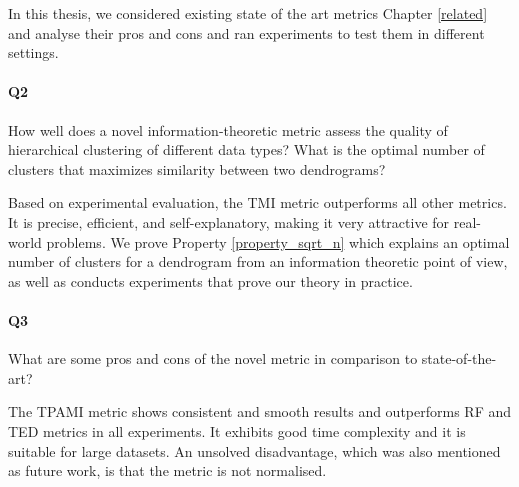 In this thesis, we considered existing state of the art metrics Chapter \ref{related} and analyse their pros and cons and ran experiments to test them in different settings. 

\paragraph{Q2}
How well does a novel information-theoretic metric assess the quality of hierarchical clustering of different data types? What is the optimal number of clusters that maximizes similarity between two dendrograms?

Based on experimental evaluation, the TMI metric outperforms all other metrics. It is precise, efficient, and self-explanatory, making it very attractive for real-world problems. We prove Property \ref{property_sqrt_n} which explains an optimal number of clusters for a dendrogram from an information theoretic point of view, as well as conducts experiments that prove our theory in practice.  

\paragraph{Q3}
What are some pros and cons of the novel metric in comparison to state-of-the-art?

The TPAMI metric shows consistent and smooth results and outperforms RF and TED metrics in all experiments. It exhibits good time complexity and it is suitable for large datasets. An unsolved disadvantage, which was also mentioned as future work, is that the metric is not normalised.